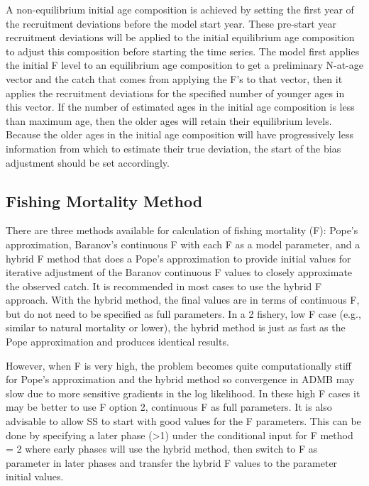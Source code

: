 A non-equilibrium initial age composition is achieved by setting the first year of the recruitment deviations before the model start year. These pre-start year recruitment deviations will be applied to the initial equilibrium age composition to adjust this composition before starting the time series. The model first applies the initial F level to an equilibrium age composition to get a preliminary N-at-age vector and the catch that comes from applying the F's to that vector, then it applies the recruitment deviations for the specified number of younger ages in this vector. If the number of estimated ages in the initial age composition is less than maximum age, then the older ages will retain their equilibrium levels. Because the older ages in the initial age composition will have progressively less information from which to estimate their true deviation, the start of the bias adjustment should be set accordingly.

\subsection{Fishing Mortality Method}
There are  three methods available for calculation of fishing mortality (F): Pope's approximation, Baranov's continuous F with each F as a model parameter, and a hybrid F method that does a Pope's approximation to provide initial values for iterative adjustment of the Baranov continuous F values to closely approximate the observed catch.  It is recommended in most cases to use the hybrid F approach. With the hybrid method, the final values are in terms of continuous F, but do not need to be specified as full parameters. In a 2 fishery, low F case (e.g., similar to natural mortality or lower), the hybrid method is just as fast as the Pope approximation and produces identical results. 

However, when F is very high, the problem becomes quite computationally stiff for Pope's approximation and the hybrid method so convergence in ADMB may slow due to more sensitive gradients in the log likelihood. In these high F cases it may  be better to use F option 2, continuous F as full parameters. It is also advisable to allow SS to start with good values for the F parameters.  This can be done by specifying a later phase (>1) under the conditional input for F method = 2 where early phases will use the hybrid method, then switch to F as parameter in later phases and transfer the hybrid F values to the parameter initial values.

